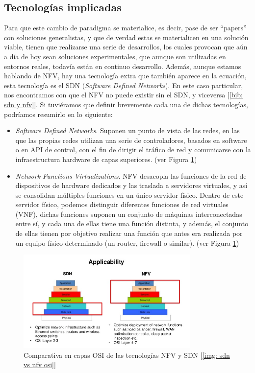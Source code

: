 \documentclass[12pt]{article}
\begin{document}
	\subsection{Tecnologías implicadas}
	\noindent Para que este cambio de paradigma se materialice, es decir, pase de ser ``papers'' con soluciones generalistas, y que de verdad estas se materialicen en una solución viable, tienen que realizarse una serie de desarrollos, los cuales provocan que aún a día de hoy sean soluciones experimentales, que aunque son utilizadas en entornos reales, todavía están en continuo desarrollo. Además, aunque estamos hablando de NFV, hay una tecnología extra que también aparece en la ecuación, esta tecnología es el SDN (\textit{Software Defined Networks}). En este caso particular, nos encontramos con que el NFV no puede existir sin el SDN, y viceversa [\ref{bib: sdn y nfv}]. Si tuviéramos que definir brevemente cada una de dichas tecnologías, podríamos resumirlo en lo siguiente:
	\begin{itemize}
		\item \textit{Software Defined Networks}. Suponen un punto de vista de las redes, en las que las propias redes utilizan una serie de controladores, basados en software o en API de control, con el fin de dirigir el tráfico de red y comunicarse con la infraestructura hardware de capas superiores. (ver Figura \ref{img: sdn + nfv})
		 
		\item \textit{Network Functions Virtualizations}. NFV desacopla las funciones de la red de dispositivos de hardware dedicados y las traslada a servidores virtuales, y así se consolidan múltiples funciones en un único servidor físico. Dentro de este servidor físico, podemos distinguir diferentes funciones de red virtuales (VNF), dichas funciones suponen un conjunto de máquinas interconectadas entre sí, y cada una de ellas tiene una función distinta, y además, el conjunto de ellas tienen por objetivo realizar una función que antes era realizada por un equipo físico determinado (un router, firewall o similar). (ver Figura \ref{img: sdn + nfv})
	\end{itemize}

	\begin{figure}[h!]
		\begin{center}
			\includegraphics[width=0.8\textwidth]{img/sdn-y-nfv.jpg}
			\caption{Comparativa en capas OSI de las tecnologías NFV y SDN [\ref{img: sdn vs nfv osi}] }
			\label{img: sdn + nfv}
		\end{center}
	\end{figure}
\end{document}
